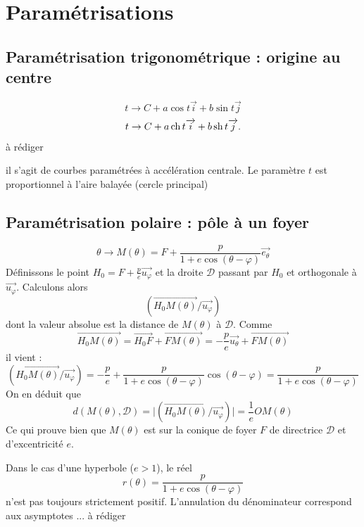 \section{Paramétrisations}
\subsection{Paramétrisation trigonométrique : origine au centre}
\begin{displaymath}
 t \rightarrow C + a\cos t \overrightarrow i + b\sin t \overrightarrow j 
\end{displaymath}
\begin{displaymath}
 t \rightarrow C + a\mathop{\mathrm{ch}} t \overrightarrow i + b\mathop{\mathrm{sh}} t \overrightarrow j.
\end{displaymath}
à rédiger

il s'agit de courbes paramétrées à accélération centrale. Le paramètre $t$ est proportionnel à l'aire balayée (cercle principal)
\subsection{Paramétrisation polaire : pôle à un foyer}
\begin{displaymath}
 \theta\rightarrow M(\theta) = F + \frac{p}{1+e\cos(\theta -\varphi)}\overrightarrow{e_\theta}
\end{displaymath}
Définissons le point $H_0 = F + \frac{p}{e}\overrightarrow{u_\varphi}$ et la droite $\mathcal D$ passant par $H_0$ et orthogonale à $\overrightarrow{u_\varphi}$. Calculons alors
\begin{displaymath}
 (\overrightarrow{H_0M(\theta)}/\overrightarrow{u_\varphi})
\end{displaymath}
dont la valeur absolue est la distance de $M(\theta)$ à $\mathcal D$. Comme 
\begin{displaymath}
 \overrightarrow{H_0M(\theta)} = \overrightarrow{H_0F} + \overrightarrow{FM(\theta)}=
-\frac{p}{e}\overrightarrow{u_\theta}+ \overrightarrow{FM(\theta)}
\end{displaymath}
il vient :
\begin{displaymath}
 (\overrightarrow{H_0M(\theta)}/\overrightarrow{u_\varphi})=
-\frac{p}{e}+ \frac{p}{1+e\cos(\theta -\varphi)}\cos(\theta -\varphi)= \frac{p}{1+e\cos(\theta -\varphi)}
\end{displaymath}
On en déduit que
\begin{displaymath}
 d(M(\theta),\mathcal D) = \vert (\overrightarrow{H_0M(\theta)}/\overrightarrow{u_\varphi})\vert
= \frac{1}{e}OM(\theta)
\end{displaymath}
Ce qui prouve bien que $M(\theta)$ est sur la conique de foyer $F$ de directrice $\mathcal D$ et d'excentricité $e$.
\begin{rem}
 Dans le cas d'une hyperbole ($e>1$), le réel
\begin{displaymath}
 r(\theta) = \frac{p}{1+e\cos(\theta -\varphi)}
\end{displaymath}
n'est pas toujours strictement positif. L'annulation du dénominateur correspond aux asymptotes ... à rédiger
\end{rem}

